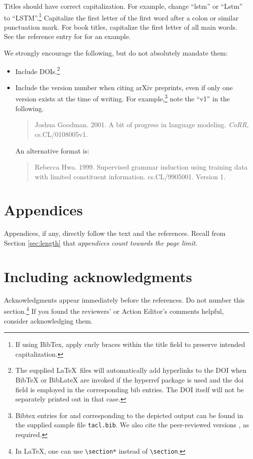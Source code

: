 \documentclass[11pt,a4paper]{article}
\begin{document}
Titles should have correct capitalization.  For example, change
``lstm'' or ``Lstm'' to ``LSTM''.\footnote{If using BibTex, apply curly braces
within the title field to preserve intended capitalization.}   Capitalize the
first letter of the first word after a colon or similar punctuation mark.  For
book titles, capitalize the first letter of all main words.  See the
reference entry for \citet{Jurafsky+Martin:2009a} for an example.


We strongly encourage the following, but do not absolutely mandate them:
\begin{itemize}
\item Include DOIs.\footnote{The supplied \LaTeX\ files will
automatically add hyperlinks to the DOI when BibTeX or
BibLateX are invoked if the hyperref package is used and
the doi field is employed in the corresponding bib entries.
The DOI itself will not be separately printed out in that case.}
\item Include the version number when citing arXiv preprints, even if only one
version exists at the time of writing.
For example,\footnote{Bibtex entries for \citet{DBLP:journals/corr/cs-CL-0108005} and
\citet{DBLP:journals/corr/cs-CL-9905001} corresponding to the depicted output
can be found in the supplied sample file {\tt tacl.bib}.  We also cite
the peer-reviewed versions \cite{GOODMAN2001403,P99-1010}, as required.}
note the ``v1'' in the following.
\begin{quote}
Joshua Goodman.  2001.  A bit of progress in language modeling. {\it CoRR},
cs.CL/0108005v1.
\end{quote}
An alternative format is:
\begin{quote}
Rebecca Hwa. 1999. Supervised grammar induction using training data with limited constituent
information. {cs.CL/9905001}. Version 1.
\end{quote}
\end{itemize}

\section{Appendices} Appendices, if any, directly follow the text and the
references.  Recall from Section \ref{sec:length} that {\em appendices count
towards the page
limit.}


\iftaclpubformat

\section{Including acknowledgments}
Acknowledgments appear immediately before the references.  Do not number this
section.\footnote{In \LaTeX, one can use {\tt {\textbackslash}section*} instead
of {\tt {\textbackslash}section}.} If you found the reviewers' or Action
Editor's comments helpful, consider acknowledging them.
\else
\fi
\end{document}
